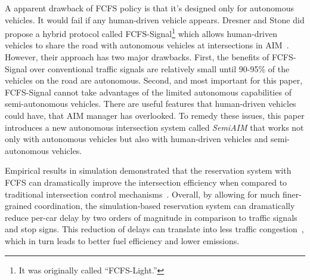 A apparent drawback of FCFS policy is that it's designed only for
autonomous vehicles. It would fail if any human-driven vehicle
appears. Dresner and Stone did propose a hybrid protocol called
FCFS-Signal\footnote{It was originally called ``FCFS-Light.''} which
allows human-driven vehicles to share the road with autonomous
vehicles at intersections in AIM~\cite{bib:Dresner07Sharing}. However,
their approach has two major drawbacks.  First, the benefits of
FCFS-Signal over conventional traffic signals are relatively small
until 90-95\% of the vehicles on the road are autonomous.  Second, and
most important for this paper, FCFS-Signal cannot take advantages of
the limited autonomous capabilities of semi-autonomous vehicles. There
are useful features that human-driven vehicles could have, that AIM
manager has overlooked. To remedy these issues, this paper introduces
a new autonomous intersection system called \emph{SemiAIM} that works
not only with autonomous vehicles but also with human-driven vehicles
and semi-autonomous vehicles.  

Empirical results in simulation demonstrated that the 
reservation system with FCFS can dramatically improve the intersection
efficiency when compared to traditional intersection control
mechanisms~\cite{bib:Dresner08Multiagent}.  Overall, by
allowing for much finer-grained coordination, the simulation-based
reservation system can dramatically reduce per-car delay by two orders
of magnitude in comparison to traffic signals and stop signs.  This
reduction of delays can translate into less traffic
congestion~\cite{bib:Au10Motion,bib:Quinlan10Bringing}, which in turn
leads to better fuel efficiency and lower emissions.

